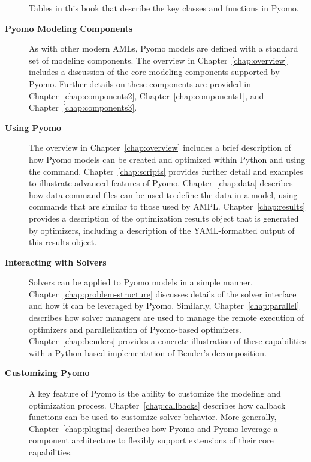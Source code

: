 \begin{description}
\begin{table}[tb]
\caption{\label{table:intro:tables} Tables in this book that describe the key classes and functions in Pyomo.}
\end{table}


\item[{\bf Pyomo Modeling Components}] As with other modern AMLs,
Pyomo models are defined with a standard set of modeling components.
The overview in Chapter~\ref{chap:overview} includes a discussion of
the core modeling components supported by Pyomo.  Further details on
these components are provided in Chapter~\ref{chap:components2}, Chapter~\ref{chap:components1}, and Chapter~\ref{chap:components3}.


\item[{\bf Using Pyomo}] The overview in Chapter~\ref{chap:overview}
includes a brief description of how Pyomo models can be created and
optimized within Python and using the  command.
Chapter~\ref{chap:scripts} provides further detail and examples
to illustrate advanced features of Pyomo.  Chapter~\ref{chap:data}
describes how data command files can be used to define the data
in a model, using commands that are similar to those used by AMPL.
Chapter~\ref{chap:results} provides a description of the optimization
results object that is generated by optimizers, including a description
of the YAML-formatted output of this results object.
\fi

\item[{\bf Interacting with Solvers}] Solvers can be applied to Pyomo
models in a simple manner.  Chapter~\ref{chap:problem-structure} discusses
details of the solver interface and how it can be leveraged by Pyomo.
Similarly, Chapter~\ref{chap:parallel} describes how solver managers are
used to manage the remote execution of optimizers and parallelization of
Pyomo-based optimizers.  Chapter~\ref{chap:benders} provides a concrete
illustration of these capabilities with a Python-based implementation
of Bender's decomposition.
\fi

\item[{\bf Customizing Pyomo}] A key feature of Pyomo is the
ability to customize the modeling and optimization process.
Chapter~\ref{chap:callbacks} describes how callback functions can be used
to customize solver behavior.  More generally, Chapter~\ref{chap:plugins}
describes how Pyomo and Pyomo leverage a component architecture to
flexibly support extensions of their core capabilities.
\fi


\end{description}

